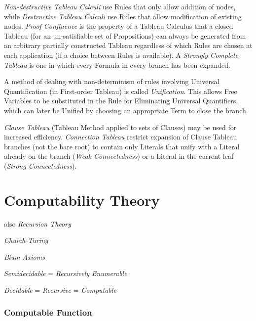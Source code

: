 \documentclass{article}
\begin{document}
\emph{Non-destructive Tableau Calculi} use Rules that only allow
addition of nodes, while \emph{Destructive Tableau Calculi} use Rules
that allow modification of existing nodes. \emph{Proof Confluence} is
the property of a Tableau Calculus that a closed Tableau (for an
un-satisfiable set of Propositions) can always be generated from an
arbitrary partially constructed Tableau regardless of which Rules are
chosen at each application (if a choice between Rules is available). A
\emph{Strongly Complete Tableau} is one in which every Formula in
every branch has been expanded.

A method of dealing with non-determinism of rules involving Universal
Quantification (in First-order Tableau) is called
\emph{Unification}. This allows Free Variables to be substituted in
the Rule for Eliminating Universal Quantifiers, which can later be
Unified by choosing an appropriate Term to close the branch.

\emph{Clause Tableau} (Tableau Method applied to sets of Clauses) may
be used for increased efficiency. \emph{Connection Tableau} restrict
expansion of Clause Tableau branches (not the bare root) to contain
only Literals that unify with a Literal already on the branch
(\emph{Weak Connectedness}) or a Literal in the current leaf
(\emph{Strong Connectedness}).



\part{Computability Theory}\cite{czoo14}\label{sec:recursion_theory}

also \emph{Recursion Theory}

\emph{Church-Turing}

\emph{Blum Axioms}

\emph{Semidecidable} = \emph{Recursively Enumerable}

\emph{Decidable} = \emph{Recursive} = \emph{Computable}



\section{Computable Function}\label{sec:computable_function}
\end{document}
